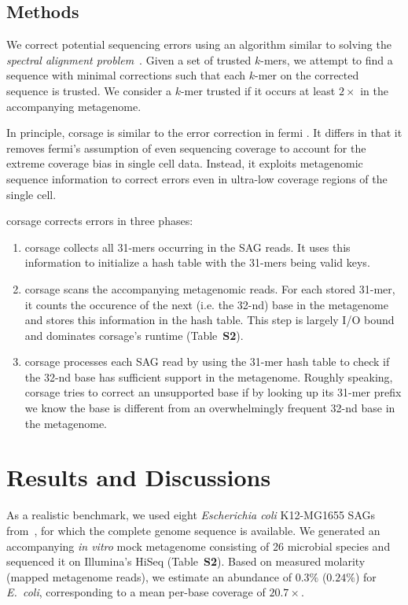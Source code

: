 \documentclass{bioinfo}
\begin{document}
\begin{methods}
\section{Methods}

We correct potential sequencing errors using an algorithm similar to solving the \emph{spectral alignment problem}~\citep{euler}.
Given a set of trusted $k$-mers, we attempt to find a sequence with minimal corrections such that each $k$-mer on the corrected sequence is trusted.
We consider a $k$-mer trusted if it occurs at least $2\times$ in the accompanying metagenome. %

In principle, corsage is similar to the error correction in fermi \citep{fermi}.
It differs in that it removes fermi's assumption of even sequencing coverage to account for the extreme coverage bias in single cell data.
Instead, it exploits metagenomic sequence information to correct errors even in ultra-low coverage regions of the single cell.

corsage corrects errors in three phases:
\begin{enumerate}
\item corsage collects all 31-mers occurring in the SAG reads. It uses this information to initialize a hash table with the 31-mers being valid keys.
\item corsage scans the accompanying metagenomic reads. For each stored 31-mer, it counts the occurence of the next (i.e. the 32-nd) base in the metagenome and stores this information in the hash table. This step is largely I/O bound and dominates corsage's runtime (Table~\textbf{S2}). %
\item corsage processes each SAG read by using the 31-mer hash table to check if the 32-nd base has sufficient support in the metagenome.
Roughly speaking, corsage tries to correct an unsupported base if by looking up its 31-mer prefix we know the base is different from an overwhelmingly frequent 32-nd base in the metagenome.
\end{enumerate}
\end{methods}

\section{Results and Discussions}

As a realistic benchmark, we used eight \textit{Escherichia coli} K12-MG1655 SAGs from~\citealp{scott2}, for which the complete genome sequence is available.
We generated an accompanying \emph{in vitro} mock metagenome consisting of 26 microbial species and sequenced it on Illumina's HiSeq (Table~\textbf{S2}). %
Based on measured molarity (mapped metagenome reads), we estimate an abundance of $0.3\%$ ($0.24\%$) for \textit{E.~coli}, corresponding to a mean per-base coverage of $20.7\times$. %
\end{document}
